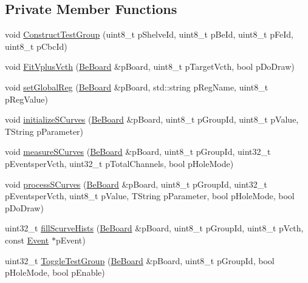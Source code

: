 \subsection*{Private Member Functions}
\begin{CompactItemize}
\item 
void \hyperlink{class_calibration_6fbe71051d2006b42b0ef359bf5df44c}{Construct\-Test\-Group} (uint8\_\-t p\-Shelve\-Id, uint8\_\-t p\-Be\-Id, uint8\_\-t p\-Fe\-Id, uint8\_\-t p\-Cbc\-Id)
\item 
void \hyperlink{class_calibration_bb8c03c4daadb9063e4ef00303eda3bd}{Fit\-Vplus\-Vcth} (\hyperlink{class_ph2___hw_description_1_1_be_board}{Be\-Board} \&p\-Board, uint8\_\-t p\-Target\-Vcth, bool p\-Do\-Draw)
\item 
void \hyperlink{class_calibration_f70b5ced67623bace3f122e6ff96fe33}{set\-Global\-Reg} (\hyperlink{class_ph2___hw_description_1_1_be_board}{Be\-Board} \&p\-Board, std::string p\-Reg\-Name, uint8\_\-t p\-Reg\-Value)
\item 
void \hyperlink{class_calibration_4bcd5273c929942732583cf3b7b4fed8}{initialize\-SCurves} (\hyperlink{class_ph2___hw_description_1_1_be_board}{Be\-Board} \&p\-Board, uint8\_\-t p\-Group\-Id, uint8\_\-t p\-Value, TString p\-Parameter)
\item 
void \hyperlink{class_calibration_b4219c9939ddc49ca79fdaf9e13ba321}{measure\-SCurves} (\hyperlink{class_ph2___hw_description_1_1_be_board}{Be\-Board} \&p\-Board, uint8\_\-t p\-Group\-Id, uint32\_\-t p\-Eventsper\-Vcth, uint32\_\-t p\-Total\-Channels, bool p\-Hole\-Mode)
\item 
void \hyperlink{class_calibration_0c4e31e30ac0adf287e163960d761091}{process\-SCurves} (\hyperlink{class_ph2___hw_description_1_1_be_board}{Be\-Board} \&p\-Board, uint8\_\-t p\-Group\-Id, uint32\_\-t p\-Eventsper\-Vcth, uint8\_\-t p\-Value, TString p\-Parameter, bool p\-Hole\-Mode, bool p\-Do\-Draw)
\item 
uint32\_\-t \hyperlink{class_calibration_e8231544cb5098450e714f98a9e66a60}{fill\-Scurve\-Hists} (\hyperlink{class_ph2___hw_description_1_1_be_board}{Be\-Board} \&p\-Board, uint8\_\-t p\-Group\-Id, uint8\_\-t p\-Vcth, const \hyperlink{class_ph2___hw_interface_1_1_event}{Event} $\ast$p\-Event)
\item 
uint32\_\-t \hyperlink{class_calibration_cc42b29fa0301ecab251a51902603765}{Toggle\-Test\-Group} (\hyperlink{class_ph2___hw_description_1_1_be_board}{Be\-Board} \&p\-Board, uint8\_\-t p\-Group\-Id, bool p\-Hole\-Mode, bool p\-Enable)
\item 

\end{CompactItemize}
